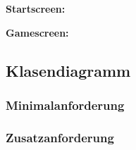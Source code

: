 \documentclass{article}
\begin{document}
\textbf{Startscreen:}
\begin{figure}[h]
    \centering
\end{figure}

\textbf{Gamescreen:}
\begin{figure}[h]
    \centering
\end{figure}

\newpage

\subsection{Klasendiagramm}

\subsubsection{Minimalanforderung}
\subsubsection{Zusatzanforderung}
\end{document}

